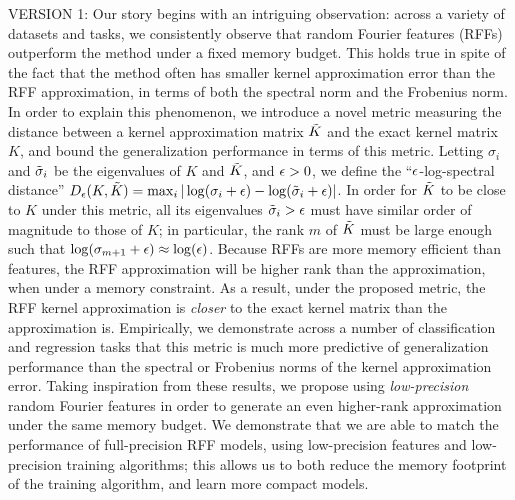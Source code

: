 VERSION 1: Our story begins with an intriguing observation: across a variety of datasets and tasks, we consistently observe that random Fourier features (RFFs) \citep{rahimi07random} outperform the \Nystrom method \citep{nystrom} under a fixed memory budget. This holds true in spite of the fact that the \Nystrom method often has smaller kernel approximation error than the RFF approximation, in terms of both the spectral norm and the Frobenius norm. In order to explain this phenomenon, we introduce a novel metric measuring the distance between a kernel approximation matrix $\tilde{K}$ and the exact kernel matrix $K$, and bound the generalization performance in terms of this metric.  Letting $\sigma_i$ and $\tilde{\sigma}_i$ be the eigenvalues of $K$ and $\tilde{K}$, and $\epsilon > 0$, we define the ``$\epsilon$-log-spectral distance'' $D_{\epsilon}(K,\tilde{K}) =  \max_i |\log(\sigma_i + \epsilon)-\log(\tilde{\sigma}_i+\epsilon)|$. In order for $\tilde{K}$ to be close to $K$ under this metric, all its eigenvalues $\tilde{\sigma}_i > \epsilon$ must have similar order of magnitude to those of $K$; in particular, the rank $m$ of $\tilde{K}$ must be large enough such that $\log(\sigma_{m+1} + \epsilon) \approx \log(\epsilon)$.
Because RFFs are more memory efficient than \Nystrom features, the RFF approximation will be higher rank than the \Nystrom approximation, when under a memory constraint.  As a result, under the proposed metric, the RFF kernel approximation is \emph{closer} to the exact kernel matrix than the \Nystrom approximation is. Empirically, we demonstrate across a number of classification and regression tasks that this metric is much more predictive of generalization performance than the spectral or Frobenius norms of the kernel approximation error. 
Taking inspiration from these results, we propose using \emph{low-precision} random Fourier features in order to generate an even higher-rank approximation under the same memory budget. We demonstrate that we are able to match the performance of full-precision RFF models, using low-precision features and low-precision training algorithms; this allows us to both reduce the memory footprint of the training algorithm, and learn more compact models.



